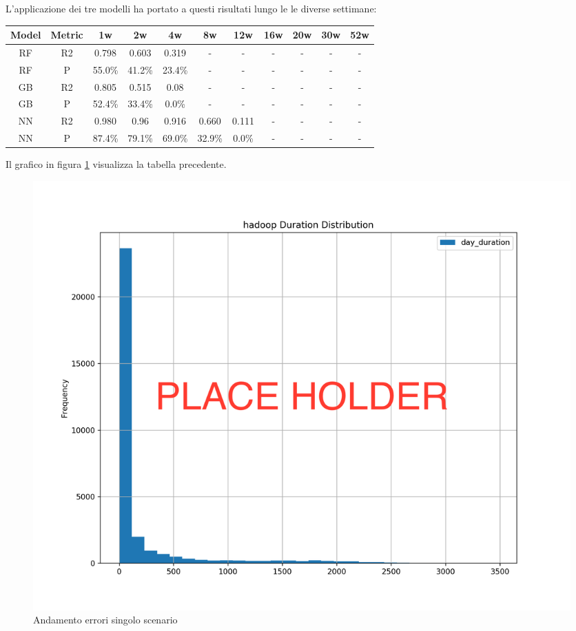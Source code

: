 \documentclass[%
    corpo=12pt,
    twoside,
    oldstyle,
    autoretitolo,
    greek,
    evenboxes,
]{toptesi}
\begin{document}
L'applicazione dei tre modelli ha portato a questi risultati lungo le le diverse settimane:
\begin{center}
   \label{tab:single_scen_hadoop}
  \begin{tabular}{ |c|c|c|c|c|c|c|c|c|c|c| }
     \hline
     \textbf{Model} & \textbf{Metric} & \textbf{1w} & \textbf{2w} & \textbf{4w} & \textbf{8w} & \textbf{12w} & \textbf{16w} & \textbf{20w} & \textbf{30w}  & \textbf{52w} \\
     \hline
     \hline
     RF & R2 & 0.798 & 0.603 & 0.319 & - & - & - & - & - & -\\
     \hline
     RF & P & 55.0\% & 41.2\% & 23.4\% & - & - & - & - & - & -\\
     \hline
     \hline
     GB & R2 & 0.805 & 0.515 & 0.08 & - & - & - & - & - & -\\
     \hline
     GB & P & 52.4\% & 33.4\% & 0.0\% & - & - & - & - & - & -\\
     \hline
     \hline
     NN & R2 & 0.980 & 0.96 & 0.916 & 0.660 & 0.111 & - & - & - & -\\
     \hline
     NN & P & 87.4\% & 79.1\% & 69.0\% & 32.9\% & 0.0\% & - & - & - & -\\
     \hline
  \end{tabular}
\end{center}
Il grafico in figura \ref{fig:single_scenario_error} visualizza la tabella precedente.
\begin{figure}[!ht]
  \includegraphics[width=\linewidth]{figure/place_holder.png}
  \caption{Andamento errori singolo scenario}
  \label{fig:single_scenario_error}
\end{figure}
\end{document}
